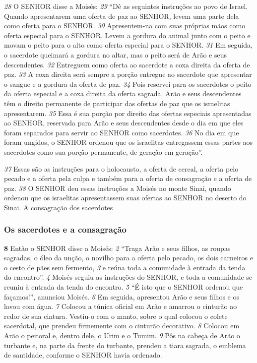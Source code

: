 \smallskip
\textit{\tiny 28}
O SENHOR disse a Moisés: 
\textit{\tiny 29}
“Dê as seguintes instruções ao povo de Israel.
Quando apresentarem uma oferta de paz ao SENHOR, levem uma parte dela como
oferta para o SENHOR. 
\textit{\tiny 30}
Apresentem-na com suas próprias mãos como oferta
especial para o SENHOR. Levem a gordura do animal junto com o peito e movam o
peito para o alto como oferta especial para o SENHOR. 
\textit{\tiny 31}
Em seguida, o sacerdote
queimará a gordura no altar, mas o peito será de Arão e seus descendentes.
\textit{\tiny 32}
Entreguem como oferta ao sacerdote a coxa direita da oferta de paz. 
\textit{\tiny 33}
A coxa
direita será sempre a porção entregue ao sacerdote que apresentar o sangue e a
gordura da oferta de paz. 
\textit{\tiny 34}
Pois reservei para os sacerdotes o peito da oferta
especial e a coxa direita da oferta sagrada. Arão e seus descendentes têm o direito
permanente de participar das ofertas de paz que os israelitas apresentarem.
\textit{\tiny 35}
Essa é sua porção por direito das ofertas especiais apresentadas ao SENHOR,
reservada para Arão e seus descendentes desde o dia em que eles foram
separados para servir ao SENHOR como sacerdotes. 
\textit{\tiny 36}
No dia em que foram
ungidos, o SENHOR ordenou que os israelitas entregassem essas partes aos
sacerdotes como sua porção permanente, de geração em geração”.
   
\bigskip
\textit{\tiny 37}
Essas são as instruções para o holocausto, a oferta de cereal, a oferta pelo
pecado e a oferta pela culpa e também para a oferta de consagração e a oferta de
paz. 
\textit{\tiny 38}
O SENHOR deu essas instruções a Moisés no monte Sinai, quando ordenou
que os israelitas apresentassem suas ofertas ao SENHOR no deserto do Sinai.
A consagração dos sacerdotes
   
\bigskip
\subsubsection*{Os sacerdotes e a consagração}  
\textbf{\large 8} Então o SENHOR disse a Moisés: 
\textit{\tiny 2} 
“Traga Arão e seus filhos, as roupas sagradas,
o óleo da unção, o novilho para a oferta pelo pecado, os dois carneiros e o cesto de
pães sem fermento, 
\textit{\tiny 3} 
e reúna toda a comunidade à entrada da tenda do encontro”. 
\textit{\tiny 4} 
Moisés   seguiu as instruções do SENHOR, e toda a comunidade se reuniu à
entrada da tenda do encontro. 
\textit{\tiny 5} 
“É isto que o SENHOR ordenou que façamos!”,
anunciou Moisés. 
\textit{\tiny 6} 
Em seguida, apresentou Arão e seus filhos e os lavou com água. 
\textit{\tiny 7} 
Colocou a túnica oficial em Arão e amarrou o cinturão ao redor de sua cintura.
Vestiu-o com o manto, sobre o qual colocou o colete sacerdotal, que prendeu
firmemente com o cinturão decorativo. 
\textit{\tiny 8} 
Colocou em Arão o peitoral e, dentro
dele, o Urim e o Tumim. 
\textit{\tiny 9} 
Pôs na cabeça de Arão o turbante e, na parte da frente
do turbante, prendeu a tiara sagrada, o emblema de santidade, conforme o
SENHOR havia ordenado.   

